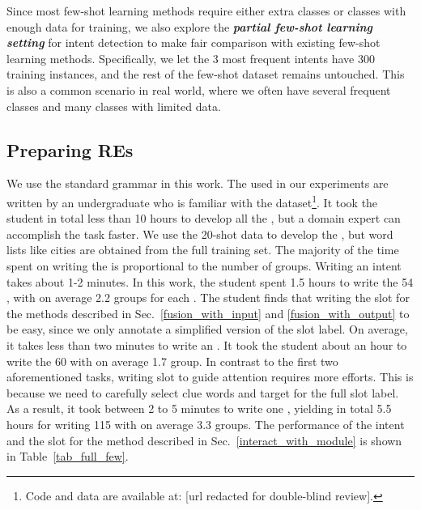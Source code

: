 Since most few-shot learning methods require either extra classes or classes with enough data for training, we also explore the
\textbf{\emph{partial few-shot learning setting}} for intent detection to make fair comparison with existing few-shot learning methods.
Specifically, we let the 3 most frequent intents have 300 training instances, and the rest of the few-shot dataset remains untouched.
This is also a common scenario in real world, where we often have several frequent classes and many classes with limited data.

\subsection{Preparing REs}
\label{re_in_exp} We use the standard \RE grammar in this work. The \REs used in our experiments are written by an undergraduate who is
familiar with the dataset\footnote{Code and data are available at: [url redacted for double-blind review].}.  It took the student in total
less than 10 hours to develop all the \REs, but a domain expert can accomplish the task faster. We use the 20-shot data to develop the
\REs, but word lists like cities are obtained from the full training set. The majority of the time spent on writing the \REs is
proportional to the number of \RE groups. Writing an intent \RE takes about 1-2 minutes. In this work, the student spent 1.5 hours to write
the 54 \REs, with on average 2.2 \RE groups for each \RE. The student finds that writing the slot \RE for the methods described in
Sec.~\ref{fusion_with_input} and \ref{fusion_with_output} to be easy, since we only annotate a simplified version of the slot label. On
average, it takes less than two minutes to write an \RE. It took the student about an hour to write the 60 \REs with on average 1.7 \RE
group. In contrast to the first two aforementioned tasks, writing slot \REs to guide attention requires more efforts. This is because we
need to carefully select clue words and target for the full slot label. As a result, it took between 2 to 5 minutes to write one \RE,
yielding in total 5.5 hours for writing 115 \REs with on average 3.3 \RE groups. The performance of the intent \REs and the slot \REs for
the method described in Sec.~\ref{interact_with_module} is shown in Table~\ref{tab_full_few}.


